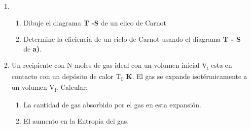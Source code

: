 \documentclass[a4paper,11pt]{extarticle} %
\newcommand{\ut}[1]{\textbf{#1}} %
\begin{document}
\begin{enumerate}[label=\textbf{\arabic*}), leftmargin=*]

    \item{
                \begin{enumerate}[label=\textbf{\alph* )}]
                    \item Dibuje el diagrama \ut{T -S } de un clico de Carnot
                    \item {Determine la eficiencia de un ciclo de Carnot usando el diagrama
                          \ut{T - S} de \ut{a)}}.
                \end{enumerate}
          }

    \vspace{\baselineskip}

    

    \vspace{\baselineskip}

    \item{Un recipiente con N moles de gas ideal con un volumen inicial V\textsubscript{i} esta en contacto con un
          depósito de calor T\textsubscript{0} \ut{K}. El gas se expande isotérmicamente a un volumen V\textsubscript{f}. Calcular:

                \begin{enumerate}[label=\textbf{\alph* )}]
                    \item La cantidad de gas absorbido por el gas en esta expansión.
                    \item El aumento en la Entropía del gas.
                \end{enumerate}
    }

    

    \vspace{\baselineskip}

\end{enumerate}

\end{document}
